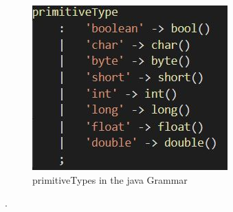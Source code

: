 \documentclass{l4proj}
\begin{document}
\begin{figure}[htb]
    \centering
    \includegraphics[width=1\linewidth]{images/primitiveTypes.JPG}
        \caption{primitiveTypes in the java Grammar
    }
    \label{fig:primitiveTypes} 
\end{figure}.
\end{document}
